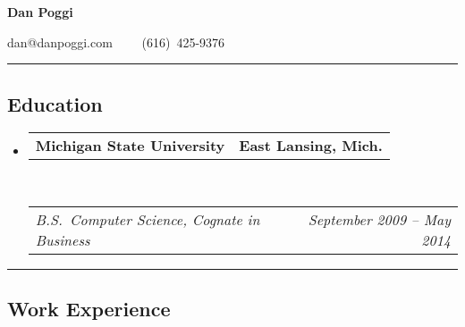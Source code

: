 \documentclass[12pt,letterpaper]{article}
\makeatletter
\newcommand{\floatcols}[2]
{\begin{tabular*}{\linewidth}{l@{\extracolsep{\fill}}r}
  #1 &
  #2 \\
\end{tabular*}}
\makeatother
\begin{document}
\begin{center}
{\LARGE \textbf{Dan Poggi}}

dan@danpoggi.com\ \ \textbullet
\ \ (616)~425-9376
\end{center}

\hrule
\vspace{-0.4em}
\subsection*{Education}

\begin{itemize}
  \parskip=0.1em

  \item 
    \floatcols
      {\textbf{Michigan State University}}
      {\textbf{East Lansing, Mich.}}
    \\
    \floatcols
      {\emph{B.S.~Computer Science, Cognate in Business}}
      {\emph{September 2009 -- May 2014}}
\end{itemize}


\hrule
\vspace{-0.4em}
\subsection*{Work Experience}
\end{document}
